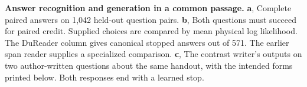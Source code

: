 \textbf{Answer recognition and generation in a common passage.}
\textbf{a}, Complete paired answers on 1,042 held-out question pairs. \textbf{b}, Both questions must succeed for paired credit. Supplied choices are compared by mean physical log likelihood. The DuReader column gives canonical stopped answers out of 571. The earlier span reader supplies a specialized comparison. \textbf{c}, The contrast writer's outputs on two author-written questions about the same handout, with the intended forms printed below. Both responses end with a learned stop.
